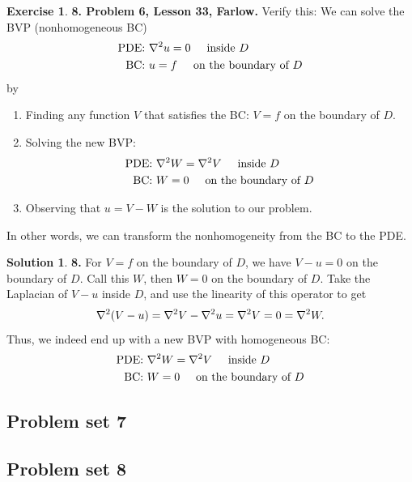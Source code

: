 \documentclass{article}
\theoremstyle{definition}
\newtheorem*{exer*}{Exercise}
\newtheorem*{sln*}{Solution}
\begin{document}
\begin{exer*}\textbf{8. Problem 6, Lesson 33, Farlow.} Verify this: We can solve the BVP (nonhomogeneous BC)
	\begin{align*}
	\text{PDE: }& \laplacian u  = 0 \hspace{0.5cm} \text{inside }D\\
	\text{BC: } & u =f \hspace{0.5cm} \text{on the boundary of }D
	\end{align*}
	by 
	\begin{enumerate}
		\item Finding any function $V$ that satisfies the BC: $V = f$ on the boundary of $D$. 
		\item Solving the new BVP:
		\begin{align*}
		\text{PDE: }& \laplacian W  = \laplacian V \hspace{0.5cm} \text{inside }D\\
		\text{BC: } & W = 0 \hspace{0.5cm} \text{on the boundary of }D
		\end{align*}
		\item Observing that $u = V - W$ is the solution to our problem. 
	\end{enumerate}
	In other words, we can transform the nonhomogeneity from the BC to the PDE.
	
	\begin{sln*}\textbf{8.} 
		For $V = f$ on the boundary of $D$, we have $V - u = 0$ on the boundary of $D$. Call this $W$, then $W = 0$ on the boundary of $D$. Take the Laplacian of $V-u$ inside $D$, and use the linearity of this operator to get
		\begin{align*}
		\laplacian (V-u) = \laplacian V - \laplacian u = \laplacian V =  0 = \laplacian W.
		\end{align*}
		Thus, we indeed end up with a new BVP with homogeneous BC:
		\begin{align*}
		\text{PDE: }& \laplacian W  = \laplacian V \hspace{0.5cm} \text{inside }D\\
		\text{BC: } & W = 0 \hspace{0.5cm} \text{on the boundary of }D
		\end{align*}
	\end{sln*}
\end{exer*}




\newpage













\newpage
\subsection{Problem set 7}




\newpage
\subsection{Problem set 8}
\end{document}
